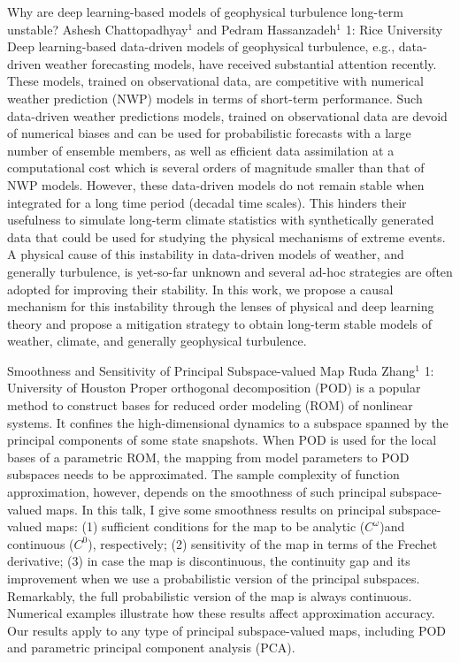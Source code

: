 \vspace{1.5ex}
\abs
{Why are deep learning-based models of geophysical turbulence long-term unstable?}
{Ashesh Chattopadhyay$^1$ and Pedram Hassanzadeh$^1$}
{1: Rice University}
{Deep learning-based data-driven models of geophysical turbulence, e.g., data-driven weather forecasting models, have received substantial attention recently. These models, trained on observational data,  are competitive with numerical weather prediction (NWP) models in terms of short-term performance. Such data-driven weather predictions models, trained on observational data are devoid of numerical biases and can be used for probabilistic forecasts with a large number of ensemble members, as well as efficient data assimilation at a computational cost which is several orders of magnitude smaller than that of NWP models. However, these data-driven models do not remain stable when integrated for a long time period (decadal time scales). This hinders their usefulness to simulate long-term climate statistics with synthetically generated data that could be used for studying the physical mechanisms of extreme events. A physical cause of this instability in data-driven models of weather, and generally turbulence, is yet-so-far unknown and several ad-hoc strategies are often adopted for improving their stability. In this work, we propose a causal mechanism for this instability through the lenses of physical and deep learning theory and propose a mitigation strategy to obtain long-term stable models of weather, climate, and generally geophysical turbulence.}


\vspace{1.5ex}
\abs
{Smoothness and Sensitivity of Principal Subspace-valued Map}
{Ruda Zhang$^{1}$}
{1: University of Houston}
{Proper orthogonal decomposition (POD) is a popular method to construct bases for reduced order modeling (ROM) of nonlinear systems. It confines the high-dimensional dynamics to a subspace spanned by the principal components of some state snapshots. When POD is used for the local bases of a parametric ROM, the mapping from model parameters to POD subspaces needs to be approximated. The sample complexity of function approximation, however, depends on the smoothness of such principal subspace-valued maps. In this talk, I give some smoothness results on principal subspace-valued maps: (1) sufficient conditions for the map to be analytic ($C^\omega$)and continuous ($C^0$), respectively; (2) sensitivity of the map in terms of the Frechet derivative; (3) in case the map is discontinuous, the continuity gap and its improvement when we use a probabilistic version of the principal subspaces. Remarkably, the full probabilistic version of the map is always continuous. Numerical examples illustrate how these results affect approximation accuracy. Our results apply to any type of principal subspace-valued maps, including POD and parametric principal component analysis (PCA).}


